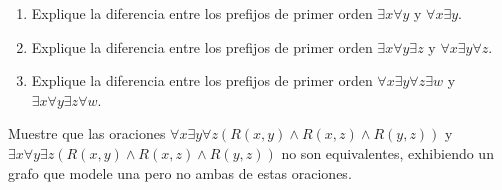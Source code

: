 \documentclass[12pt,a4paper]{book}
\begin{document}
    \begin{ejercicio}
        \begin{enumerate}[label=(\alph*)]
            \item Explique la diferencia entre los prefijos de primer orden $\exists x\forall y$ y $\forall x\exists y$.
            \item Explique la diferencia entre los prefijos de primer orden $\exists x\forall y\exists z$ y
            $\forall x\exists y\forall z$.
            \item Explique la diferencia entre los prefijos de primer orden $\forall x\exists y\forall z\exists w$ y
            $\exists x\forall y\exists z\forall w$.
        \end{enumerate}
    \end{ejercicio}

    \begin{ejercicio}
        Muestre que las oraciones $\forall x\exists y\forall z(R(x,y)\wedge R(x,z)\wedge R(y,z))$ y
        $\exists x\forall y\exists z(R(x,y)\wedge R(x,z)\wedge R(y,z))$ no son equivalentes, exhibiendo un grafo que modele
        una pero no ambas de estas oraciones.
    \end{ejercicio}
\end{document}
